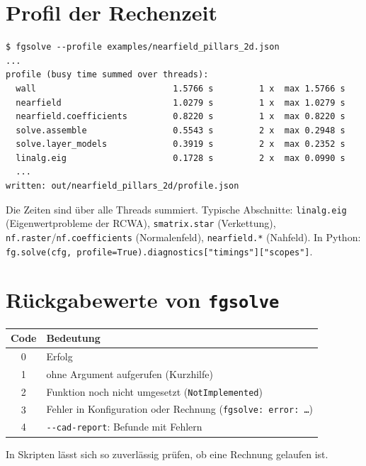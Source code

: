 \section{Profil der Rechenzeit}
%
\begin{lstlisting}[style=shell]
$ fgsolve --profile examples/nearfield_pillars_2d.json
...
profile (busy time summed over threads):
  wall                           1.5766 s         1 x  max 1.5766 s
  nearfield                      1.0279 s         1 x  max 1.0279 s
  nearfield.coefficients         0.8220 s         1 x  max 0.8220 s
  solve.assemble                 0.5543 s         2 x  max 0.2948 s
  solve.layer_models             0.3919 s         2 x  max 0.2352 s
  linalg.eig                     0.1728 s         2 x  max 0.0990 s
  ...
written: out/nearfield_pillars_2d/profile.json
\end{lstlisting}
Die Zeiten sind über alle Threads summiert. Typische Abschnitte: \texttt{linalg.eig} (Eigenwertprobleme der RCWA),
\texttt{smatrix.star} (Verkettung), \texttt{nf.raster}/\texttt{nf.coefficients} (Normalenfeld),
\texttt{nearfield.*} (Nahfeld). In Python: \texttt{fg.solve(cfg, profile=True).diagnostics["timings"]["scopes"]}.

\section{Rückgabewerte von \texttt{fgsolve}}
%
\begin{center}
\small
\begin{tabular}{cl}
\toprule
Code & Bedeutung \\
\midrule
0 & Erfolg \\
1 & ohne Argument aufgerufen (Kurzhilfe) \\
2 & Funktion noch nicht umgesetzt (\texttt{NotImplemented}) \\
3 & Fehler in Konfiguration oder Rechnung (\texttt{fgsolve: error: \ldots}) \\
4 & \texttt{-{}-cad-report}: Befunde mit Fehlern \\
\bottomrule
\end{tabular}
\end{center}
In Skripten lässt sich so zuverlässig prüfen, ob eine Rechnung gelaufen ist.
